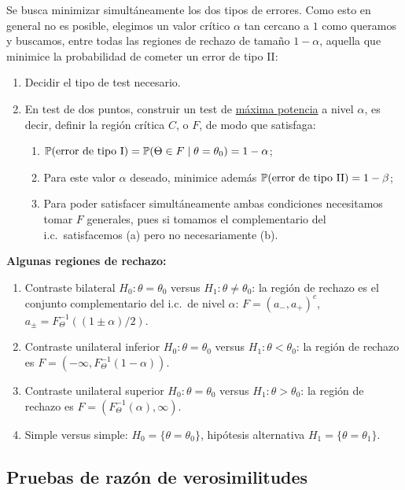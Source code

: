 \begin{definicion}
Se busca minimizar simultáneamente los dos tipos de errores. Como esto en general no es posible, elegimos un valor crítico $\alpha$ tan cercano a $1$ como queramos y buscamos, entre todas las regiones de rechazo de tamaño $1-\alpha$, aquella que minimice la probabilidad de cometer un error de tipo II:
\begin{enumerate}
  \item Decidir el tipo de test necesario.
  \item En test de dos puntos, construir un test de \underline{máxima potencia} a nivel $\alpha$, es decir, definir la región crítica $C$, o $F$, de modo que satisfaga:
  \begin{enumerate}[label=(\alph*)]
    \item $\mathbb{P}(\text{error de tipo I}) = \mathbb{P}(\Theta \in F \mid \theta = \theta_0) = 1 - \alpha$;
    \item Para este valor $\alpha$ deseado, minimice además $\mathbb{P}(\text{error de tipo II}) = 1 - \beta$;
    \item Para poder satisfacer simultáneamente ambas condiciones necesitamos tomar $F$ generales, pues si tomamos el complementario del i.c.\ satisfacemos (a) pero no necesariamente (b).
  \end{enumerate}
\end{enumerate}

\noindent \textbf{Algunas regiones de rechazo:}
\begin{enumerate}
  \item Contraste bilateral $H_0 : \theta = \theta_0$ versus $H_1 : \theta \neq \theta_0$: la región de rechazo es el conjunto complementario del i.c.\ de nivel $\alpha$: $F = (a_-, a_+)^c$, $a_\pm = F_\Theta^{-1}((1\pm\alpha)/2)$.
  \item Contraste unilateral inferior $H_0 : \theta = \theta_0$ versus $H_1 : \theta < \theta_0$: la región de rechazo es $F = (-\infty, F_\Theta^{-1}(1-\alpha))$.
  \item Contraste unilateral superior $H_0 : \theta = \theta_0$ versus $H_1 : \theta > \theta_0$: la región de rechazo es $F = (F_\Theta^{-1}(\alpha), \infty)$.
  \item Simple versus simple: $H_0 = \{\theta = \theta_0\}$, hipótesis alternativa $H_1 = \{\theta = \theta_1\}$.
\end{enumerate}
\end{definicion}

\subsection{Pruebas de razón de verosimilitudes}

